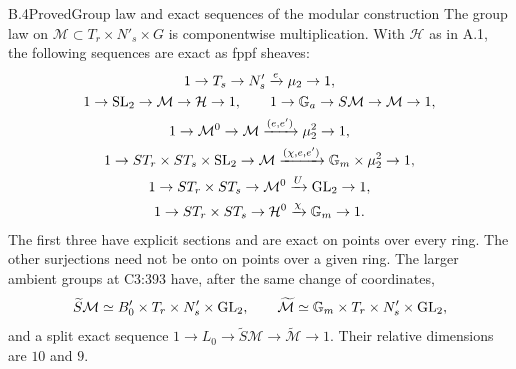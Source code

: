 \begin{statement}{B.4}{Proved}{Group law and exact sequences of the modular construction}
The group law on $\mathcal M\subset T_r\times N'_s\times G$
is componentwise multiplication. With $\mathcal H$ as in A.1,
the following sequences are exact as fppf sheaves:
\[
\begin{gathered}
1\to T_s\to N'_s\xrightarrow e\mu_2\to1,\\
1\to\operatorname{SL}_2\to\mathcal M\to\mathcal H\to1,\qquad
1\to\mathbb G_a\to S\mathcal M\to\mathcal M\to1,\\
1\to\mathcal M^0\to\mathcal M\xrightarrow{(e,e')}\mu_2^2\to1,\\
1\to ST_r\times ST_s\times\operatorname{SL}_2\to\mathcal M
 \xrightarrow{(\chi,e,e')}\mathbb G_m\times\mu_2^2\to1,\\
1\to ST_r\times ST_s\to\mathcal M^0
 \xrightarrow{U}\operatorname{GL}_2\to1,\\
1\to ST_r\times ST_s\to\mathcal H^0\xrightarrow\chi\mathbb G_m\to1.
\end{gathered}
\]
The first three have explicit sections and are exact on points
over every ring. The other surjections need not be onto on
points over a given ring.
The larger ambient groups at C3:393 have, after the same change
of coordinates,
\[
\widetilde S\mathcal M\simeq B'_0\times T_r\times N'_s\times\operatorname{GL}_2,
\qquad
\widetilde{\mathcal M}\simeq\mathbb G_m\times T_r\times N'_s\times\operatorname{GL}_2,
\]
and a split exact sequence
$1\to L_0\to\widetilde S\mathcal M\to\widetilde{\mathcal M}\to1$.
Their relative dimensions are $10$ and $9$.
\end{statement}
